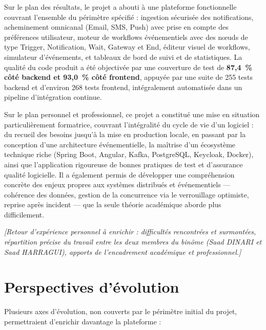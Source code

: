 \documentclass[12pt,a4paper]{report}
\newcommand{\placeholder}[1]{\par\smallskip\noindent\textcolor{placeholderred}{\itshape [#1]}\par\smallskip}
\begin{document}
Sur le plan des résultats, le projet a abouti à une plateforme fonctionnelle couvrant l'ensemble du périmètre spécifié : ingestion sécurisée des notifications, acheminement omnicanal (Email, SMS, Push) avec prise en compte des préférences utilisateur, moteur de workflows événementiels avec des n\oe uds de type Trigger, Notification, Wait, Gateway et End, éditeur visuel de workflows, simulateur d'événements, et tableaux de bord de suivi et de statistiques. La qualité du code produit a été objectivée par une couverture de test de \textbf{87,4~\% côté backend et 93,0~\% côté frontend}, appuyée par une suite de 255 tests backend et d'environ 268 tests frontend, intégralement automatisée dans un pipeline d'intégration continue.

Sur le plan personnel et professionnel, ce projet a constitué une mise en situation particulièrement formatrice, couvrant l'intégralité du cycle de vie d'un logiciel : du recueil des besoins jusqu'à la mise en production locale, en passant par la conception d'une architecture événementielle, la maîtrise d'un écosystème technique riche (Spring Boot, Angular, Kafka, PostgreSQL, Keycloak, Docker), ainsi que l'application rigoureuse de bonnes pratiques de test et d'assurance qualité logicielle. Il a également permis de développer une compréhension concrète des enjeux propres aux systèmes distribués et événementiels --- cohérence des données, gestion de la concurrence via le verrouillage optimiste, reprise après incident --- que la seule théorie académique aborde plus difficilement.

\placeholder{Retour d'expérience personnel à enrichir : difficultés rencontrées et surmontées, répartition précise du travail entre les deux membres du binôme (Saad DINARI et Saad HARRAGUI), apports de l'encadrement académique et professionnel.}

\section*{Perspectives d'évolution}

Plusieurs axes d'évolution, non couverts par le périmètre initial du projet, permettraient d'enrichir davantage la plateforme :
\end{document}
